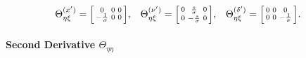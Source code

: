 \documentclass{article}
\begin{document}
%
\begin{align}
  \Theta_{\eta\xi}^{(x')}      & = \begin{bsmallmatrix} 0 & 0 & 0 \\ -\frac{1}{\sigma} & 0 & 0 \end{bsmallmatrix}, &
  \Theta_{\eta\xi}^{(\nu')}    & = \begin{bsmallmatrix} 0 & \frac{s}{\sigma} & 0 \\ 0 & -\frac{s}{\sigma} & 0 \end{bsmallmatrix}, &
  \Theta_{\eta\xi}^{(\delta')} & = \begin{bsmallmatrix} 0 & 0 & 0 \\ 0 & 0 & -\frac{1}{\sigma} \end{bsmallmatrix}.
\end{align}

\paragraph{Second Derivative $\Theta_{\eta\eta}$}
\end{document}
